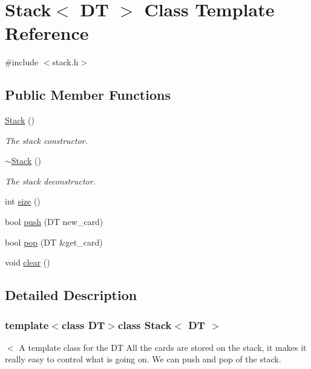 \hypertarget{class_stack}{\section{Stack$<$ D\-T $>$ Class Template Reference}
\label{class_stack}
}


{\ttfamily \#include $<$stack.\-h$>$}

\subsection*{Public Member Functions}
\begin{DoxyCompactItemize}
\item 
\hyperlink{class_stack_ad41e41e610dc6cf9bb229160f5f205d3}{Stack} ()
\begin{DoxyCompactList}\small\item\em The stack constructor. \end{DoxyCompactList}\item 
\hyperlink{class_stack_a72a1b990711e7d12b8fd0804b431ad22}{$\sim$\-Stack} ()
\begin{DoxyCompactList}\small\item\em The stack deconstructor. \end{DoxyCompactList}\item 
int \hyperlink{class_stack_a08eb7cd8ca96965989c17405808b9d42}{size} ()
\item 
bool \hyperlink{class_stack_a37519366e7a3b338bdc278a9c9b8a131}{push} (D\-T new\-\_\-card)
\item 
bool \hyperlink{class_stack_a9f16d1c68cef90bc1859afd6fce88734}{pop} (D\-T \&get\-\_\-card)
\item 
void \hyperlink{class_stack_acce5debc5c2f8e0cb5238af3d6ddc433}{clear} ()
\end{DoxyCompactItemize}


\subsection{Detailed Description}
\subsubsection*{template$<$class D\-T$>$class Stack$<$ D\-T $>$}

$<$ A template class for the D\-T All the cards are stored on the stack, it makes it really easy to control what is going on. We can push and pop of the stack. 

